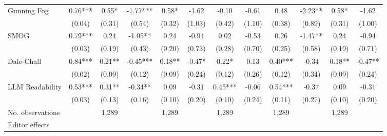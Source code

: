 \begin{table}
\begin{threeparttable}
\begin{tabular}{p{3cm}S@{}S@{}S@{}S@{}S@{}S@{}S@{}S@{}S@{}S@{}S@{}}
            Gunning Fog                   &        0.76***&        0.55*  &       -1.77***&        0.58*  &       -1.62   &       -0.10   &       -0.61   &        0.48   &       -2.23** &        0.58*  &       -1.62   \\
                                          &      (0.04)   &      (0.31)   &      (0.54)   &      (0.32)   &      (1.03)   &      (0.42)   &      (1.10)   &      (0.38)   &      (0.89)   &      (0.31)   &      (1.00)   \\
            SMOG                          &        0.79***&        0.24   &       -1.05** &        0.24   &       -0.94   &        0.02   &       -0.53   &        0.26   &       -1.47** &        0.24   &       -0.94   \\
                                          &      (0.03)   &      (0.19)   &      (0.43)   &      (0.20)   &      (0.73)   &      (0.28)   &      (0.70)   &      (0.25)   &      (0.58)   &      (0.19)   &      (0.71)   \\
            Dale-Chall                    &        0.84***&        0.21** &       -0.45***&        0.18** &       -0.47*  &        0.22*  &        0.13   &        0.40***&       -0.34   &        0.18** &       -0.47** \\
                                          &      (0.02)   &      (0.09)   &      (0.12)   &      (0.09)   &      (0.24)   &      (0.12)   &      (0.26)   &      (0.12)   &      (0.34)   &      (0.09)   &      (0.24)   \\
            LLM Readability               &        0.53***&        0.31** &       -0.34** &        0.09   &       -0.31   &        0.45***&       -0.06   &        0.54***&       -0.37   &        0.09   &       -0.31   \\
                                          &      (0.03)   &      (0.13)   &      (0.16)   &      (0.10)   &      (0.20)   &      (0.10)   &      (0.24)   &      (0.11)   &      (0.27)   &      (0.10)   &      (0.20)   \\
            \midrule
            No. observations              &               &       1,289   &               &       1,289   &               &       1,289   &               &       1,289   &               &       1,289   &               \\
            \midrule
            Editor effects       &               &           {}   &               &           {}   &               &           {}   &               &           {}   &               &               &               \\

\end{tabular}
\end{threeparttable}
\end{table}
